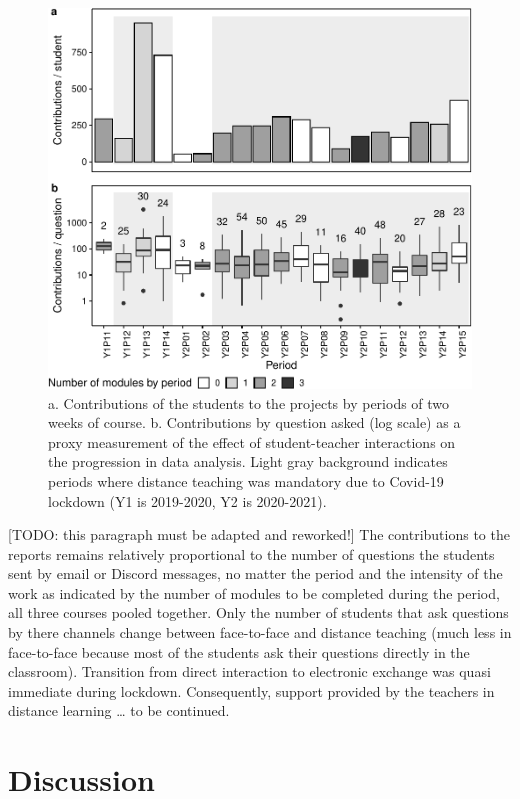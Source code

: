 \documentclass[
]{article}
\begin{document}
\begin{figure}
\centering
\includegraphics{teaching_data_science_files/figure-latex/fig_support_by_time-1.pdf}
\caption{\label{fig:fig_support_by_time} a. Contributions of the
students to the projects by periods of two weeks of course. b.
Contributions by question asked (log scale) as a proxy measurement of
the effect of student-teacher interactions on the progression in data
analysis. Light gray background indicates periods where distance
teaching was mandatory due to Covid-19 lockdown (Y1 is 2019-2020, Y2 is
2020-2021).}
\end{figure}

{[}TODO: this paragraph must be adapted and reworked!{]} The
contributions to the reports remains relatively proportional to the
number of questions the students sent by email or Discord messages, no
matter the period and the intensity of the work as indicated by the
number of modules to be completed during the period, all three courses
pooled together. Only the number of students that ask questions by there
channels change between face-to-face and distance teaching (much less in
face-to-face because most of the students ask their questions directly
in the classroom). Transition from direct interaction to electronic
exchange was quasi immediate during lockdown. Consequently, support
provided by the teachers in distance learning \ldots{} to be continued.

\hypertarget{discussion}{%
\section{Discussion}\label{discussion}}
\end{document}
